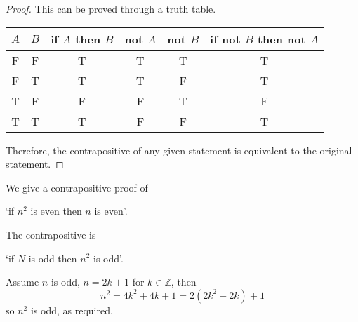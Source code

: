 \begin{proof}
    This can be proved through a truth table.
    \begin{center}
        \begin{tabular}{cccccc}
            \toprule
            $A$ & $B$ & if $A$ then $B$ & not $A$ & not $B$ & if not $B$ then not $A$ \\
            \midrule
            F & F & T & T & T & T \\
            F & T & T & T & F & T \\
            T & F & F & F & T & F \\
            T & T & T & F & F & T \\
            \bottomrule
        \end{tabular}
    \end{center}
    Therefore, the contrapositive of any given statement is equivalent to the original statement.
\end{proof}

\begin{example}
    We give a contrapositive proof of
    \begin{center}
        `if $n^2$ is even then $n$ is even'.
    \end{center}
    The contrapositive is
    \begin{center}
        `if $N$ is odd then $n^2$ is odd'.
    \end{center}
    Assume $n$ is odd, $n=2k+1$ for $k\in\mathbb Z$, then \[n^2=4k^2+4k+1=2(2k^2+2k)+1\] so $n^2$ is odd, as required.
\end{example}

